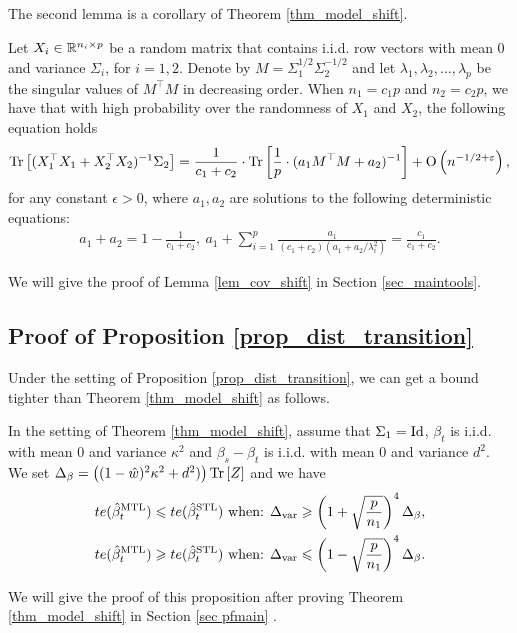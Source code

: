 The second lemma is a corollary of Theorem \ref{thm_model_shift}.
\begin{lemma}\label{lem_cov_shift}
	Let $X_i\in\mathbb{R}^{n_i\times p}$ be a random matrix that contains i.i.d. row vectors with mean $0$ and variance $\Sigma_i$, for $i = 1, 2$.
	Denote by $M = \Sigma_1^{1/2}\Sigma_2^{-1/2}$ and let $\lambda_1, \lambda_2, \dots, \lambda_p$ be the singular values of $M^{\top}M$ in decreasing order.
	When $n_1 = c_1 p$ and $n_2 = c_2 p$, we have that with high probability over the randomness of $X_1$ and $X_2$, the following equation holds
	\begin{align}%
		\bigtr{(X_1^{\top}X_1 + X_2^{\top}X_2)^{-1}\Sigma_2} = \frac{1}{c_1+c_2}\cdot \bigtr{ \frac{1}{p}\cdot(a_1 M^\top M + a_2)^{-1}} +\bigo{ n^{-1/2+\epsilon}},
	\end{align}
	for any constant $\epsilon>0$, where $a_1, a_2$ are solutions to the following deterministic equations:
	\begin{align}
		a_1 + a_2 = 1- \frac{1}{c_1 + c_2},~ a_1 + \sum_{i=1}^p \frac{a_1}{(c_1 + c_2)(a_1 + a_2/ \lambda_i^2)} = \frac{c_1}{c_1 + c_2}. \label{eq_a12}
	\end{align}
\end{lemma}
We will give the proof of Lemma \ref{lem_cov_shift} in Section \ref{sec_maintools}.


\subsection{Proof of Proposition \ref{prop_dist_transition}}

Under the setting of Proposition \ref{prop_dist_transition}, we can get a bound tighter than Theorem \ref{thm_model_shift} as follows.

	\begin{proposition}\label{prop_model_shift_tight}
		In the setting of Theorem \ref{thm_model_shift}, assume that $\Sigma_1 =\operatorname{Id}$,
		$\beta_t$ is i.i.d. with mean $0$ and variance $\kappa^2$ and $\beta_s - \beta_t$ is i.i.d. with mean $0$ and variance $d^2$. 
		We set $\Delta_{\beta} = \left({(1 - \hat{w})^2 \kappa^2 + d^2)}\right) \operatorname{Tr}\left[Z\right]$
		and we have
		\begin{align*}
			te(\hat{\beta}_t^{\text{MTL}}) \leqslant te(\hat{\beta}_t^{\text{STL}}) \text{ when: } & \Delta_{\text{var}} \geqslant \left({1 + \sqrt{\frac{p}{n_1}}}\right)^4 \Delta_{\beta}, \\
			te(\hat{\beta}_t^{\text{MTL}}) \geqslant te(\hat{\beta}_t^{\text{STL}}) \text{ when: } & \Delta_{\text{var}} \leqslant \left({1 - \sqrt{\frac{p}{n_1}}}\right)^4 \Delta_{\beta}.
		\end{align*}
	\end{proposition}
We will give the proof of this proposition after proving Theorem \ref{thm_model_shift} in Section \ref{sec pfmain}	.

